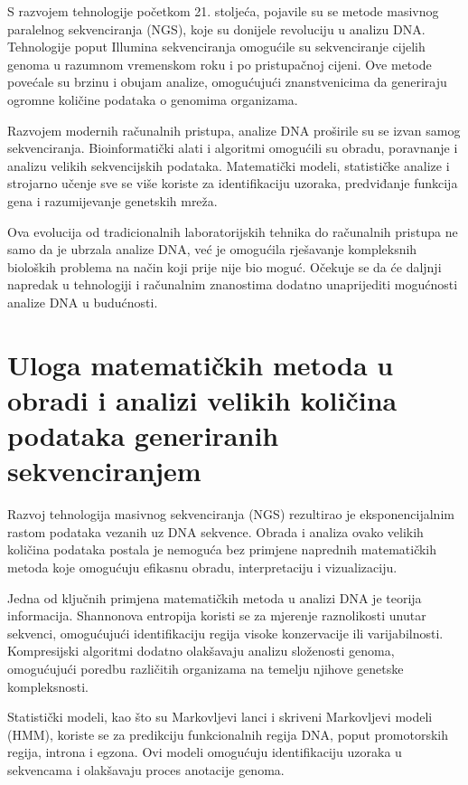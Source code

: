 \documentclass[10pt,a4paper,twoside]{article}
\begin{document}
	S razvojem tehnologije početkom 21. stoljeća, pojavile su se metode masivnog paralelnog sekvenciranja (NGS), koje su donijele revoluciju u analizu DNA. Tehnologije poput Illumina sekvenciranja omogućile su sekvenciranje cijelih genoma u razumnom vremenskom roku i po pristupačnoj cijeni. Ove metode povećale su brzinu i obujam analize, omogućujući znanstvenicima da generiraju ogromne količine podataka o genomima organizama.
	
	Razvojem modernih računalnih pristupa, analize DNA proširile su se izvan samog sekvenciranja. Bioinformatički alati i algoritmi omogućili su obradu, poravnanje i analizu velikih sekvencijskih podataka. Matematički modeli, statističke analize i strojarno učenje sve se više koriste za identifikaciju uzoraka, predviđanje funkcija gena i razumijevanje genetskih mreža.
	
	Ova evolucija od tradicionalnih laboratorijskih tehnika do računalnih pristupa ne samo da je ubrzala analize DNA, već je omogućila rješavanje kompleksnih bioloških problema na način koji prije nije bio moguć. Očekuje se da će daljnji napredak u tehnologiji i računalnim znanostima dodatno unaprijediti mogućnosti analize DNA u budućnosti.
	
\section*{Uloga matematičkih metoda u obradi i analizi velikih količina podataka generiranih sekvenciranjem}

Razvoj tehnologija masivnog sekvenciranja (NGS) rezultirao je eksponencijalnim rastom podataka vezanih uz DNA sekvence. Obrada i analiza ovako velikih količina podataka postala je nemoguća bez primjene naprednih matematičkih metoda koje omogućuju efikasnu obradu, interpretaciju i vizualizaciju.

Jedna od ključnih primjena matematičkih metoda u analizi DNA je teorija informacija. Shannonova entropija koristi se za mjerenje raznolikosti unutar sekvenci, omogućujući identifikaciju regija visoke konzervacije ili varijabilnosti. Kompresijski algoritmi dodatno olakšavaju analizu složenosti genoma, omogućujući poredbu različitih organizama na temelju njihove genetske kompleksnosti.

Statistički modeli, kao što su Markovljevi lanci i skriveni Markovljevi modeli (HMM), koriste se za predikciju funkcionalnih regija DNA, poput promotorskih regija, introna i egzona. Ovi modeli omogućuju identifikaciju uzoraka u sekvencama i olakšavaju proces anotacije genoma.
\end{document}
